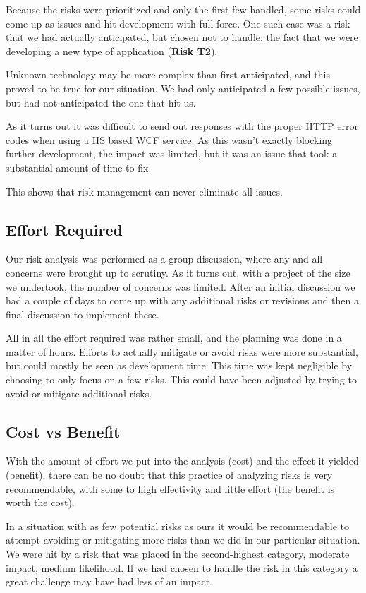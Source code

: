 Because the risks were prioritized and only the first few handled, some risks could come up as issues and
hit development with full force. One such case was a risk that we had actually anticipated, but chosen
not to handle: the fact that we were developing a new type of application (\textbf{Risk T2}).

Unknown technology may be more complex than first anticipated, and this proved to be true for our situation.
We had only anticipated a few possible issues, but had not anticipated the one that hit us.

As it turns out it was difficult to send out responses with the proper HTTP error codes when using a IIS based
WCF service. As this wasn't exactly blocking further development, the impact was limited, but it was an issue
that took a substantial amount of time to fix.

This shows that risk management can never eliminate all issues.

\subsection{Effort Required}

Our risk analysis was performed as a group discussion, where any and all concerns were brought up to scrutiny.
As it turns out, with a project of the size we undertook, the number of concerns was limited. After an initial
discussion we had a couple of days to come up with any additional risks or revisions and then a final discussion
to implement these.

All in all the effort required was rather small, and the planning was done in a matter of hours. Efforts to actually
mitigate or avoid risks were more substantial, but could mostly be seen as development time. This time was kept
negligible by choosing to only focus on a few risks. This could have been adjusted by trying to avoid or mitigate
additional risks.

\subsection{Cost vs Benefit}

With the amount of effort we put into the analysis (cost) and the effect it yielded (benefit), there can be no doubt
that this practice of analyzing risks is very recommendable, with some to high effectivity and little effort (the
benefit is worth the cost).

In a situation with as few potential risks as ours it would be recommendable to attempt avoiding or mitigating more
risks than we did in our particular situation. We were hit by a risk that was placed in the second-highest category,
moderate impact, medium likelihood. If we had chosen to handle the risk in this category a great challenge may have
had less of an impact.
